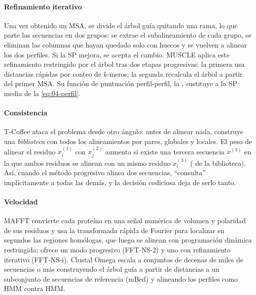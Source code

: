 \paragraph{Refinamiento iterativo} Una vez obtenido un MSA, se divide el árbol guía quitando una rama, lo que parte las secuencias en dos grupos; se extrae el subalineamiento de cada grupo, se eliminan las columnas que hayan quedado solo con huecos y se vuelven a alinear los dos perfiles. Si la SP mejora, se acepta el cambio. MUSCLE \parencite{c04-edgar2004} aplica este refinamiento restringido por el árbol tras dos etapas progresivas: la primera usa distancias rápidas por conteo de $k$-meros; la segunda recalcula el árbol a partir del primer MSA. Su función de puntuación perfil-perfil, la , sustituye a la SP media de la \cref{eq:04-perfil}.

\paragraph{Consistencia} T-Coffee \parencite{c04-notredame2000} ataca el problema desde otro ángulo: antes de alinear nada, construye una \emph{biblioteca} con todos los alineamientos por pares, globales y locales. El peso de alinear el residuo $x^{(1)}_i$ con $x^{(2)}_j$ aumenta si existe una tercera secuencia $x^{(3)}$ en la que ambos residuos se alinean con un mismo residuo $x^{(3)}_l$ ( de la biblioteca). Así, cuando el método progresivo alinea dos secuencias, ``consulta'' implícitamente a todas las demás, y la decisión codiciosa deja de serlo tanto.

\paragraph{Velocidad} MAFFT \parencite{c04-katoh2002} convierte cada proteína en una señal numérica de volumen y polaridad de sus residuos y usa la transformada rápida de Fourier para localizar en segundos las regiones homólogas, que luego se alinean con programación dinámica restringida; ofrece un modo progresivo (FFT-NS-2) y uno con refinamiento iterativo (FFT-NS-i). Clustal Omega \parencite{c04-sievers2011} escala a conjuntos de decenas de miles de secuencias o más construyendo el árbol guía a partir de distancias a un subconjunto de secuencias de referencia (mBed) y alineando los perfiles como HMM contra HMM.

